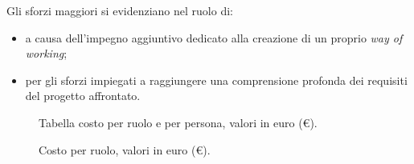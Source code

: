 Gli sforzi maggiori si evidenziano nel ruolo di:
\begin{itemize}
\item {\AMx} a causa dell'impegno aggiuntivo dedicato alla creazione di un proprio \emph{way of working};
\item {\ANx} per gli sforzi impiegati a raggiungere una comprensione profonda dei requisiti del progetto affrontato.
\end{itemize}

\begin{figure}[H]
\label{tab:car}

  \caption{Tabella costo {\AR} per ruolo e per persona, valori in euro (\euro).}
\end{figure}

\begin{figure}[H]
\caption{Costo {\AR} per ruolo, valori in euro (\euro).}
\label{fig:car}
\end{figure}



